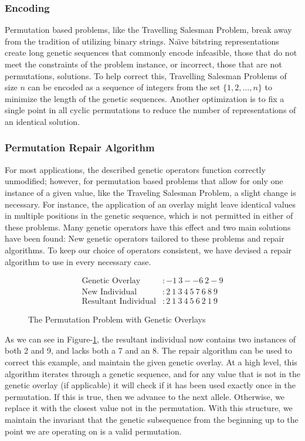 \subsubsection*{Encoding}
Permutation based problems, like the Travelling Salesman Problem, break away from the tradition of utilizing binary strings. Na\"{\i}ve bitstring representations create long genetic sequences that commonly encode infeasible, those that do not meet the constraints of the problem instance, or incorrect, those that are not permutations, solutions\cite{Potvin96}. To help correct this, Travelling Salesman Problems of size $n$ can be encoded as a sequence of integers from the set $\{1, 2, \ldots, n\}$ to minimize the length of the genetic sequences. Another optimization is to fix a single point in all cyclic permutations to reduce the number of representations of an identical solution. 

\subsubsection*{Permutation Repair Algorithm}
For most applications, the described genetic operators function correctly unmodified; however, for permutation based problems that allow for only one instance of a given value, like the Traveling Salesman Problem, a slight change is necessary. For instance, the application of an overlay might leave identical values in multiple positions in the genetic sequence, which is not permitted in either of these problems. Many genetic operators have this effect and two main solutions have been found: New genetic operators tailored to these problems and repair algorithms\cite{Larranaga99}. To keep our choice of operators consistent, we have devised a repair algorithm to use in every necessary case.
\begin{figure}[h!]
\centering 
\begin{align*}
\text{Genetic Overlay} &:   -1~3--6~2-9				\\
\text{New Individual} &: 2~1~3~4~5~7~6~8~9			\\		
\text{Resultant Individual} &: 2~1~3~4~5~6~2~1~9
\end{align*}
\caption{The Permutation Problem with Genetic Overlays}
\label{PRA-Fig}
\end{figure}

As we can see in Figure-\ref{PRA-Fig}, the resultant individual now contains two instances of both 2 and 9, and lacks both a 7 and an 8. The repair algorithm can be used to correct this example, and maintain the given genetic overlay. At a high level, this algorithm iterates through a genetic sequence, and for any value that is not in the genetic overlay (if applicable) it will check if it has been used exactly once in the permutation. If this is true, then we advance to the next allele. Otherwise, we replace it with the closest value not in the permutation. With this structure, we maintain the invariant that the genetic subsequence from the beginning up to the point we are operating on is a valid permutation.

